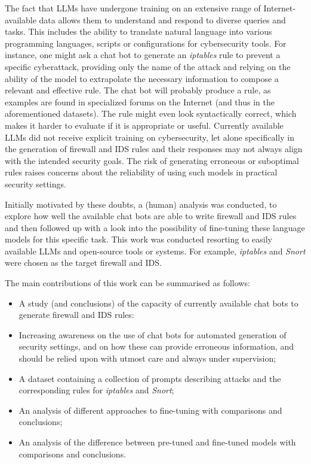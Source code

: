 \documentclass[sigconf]{acmart}
\begin{document}
The fact that LLMs have undergone training on an extensive range of Internet-available data allows them to understand and respond to diverse queries and tasks. This includes the ability to translate natural language into various programming languages, scripts or configurations for cybersecurity tools. For instance, one might ask a chat bot to generate an \textit{iptables} rule to prevent a specific cyberattack, providing only the name of the attack and relying on the ability of the model to extrapolate the necessary information to compose a relevant and effective rule. The chat bot will probably produce a rule, as examples are found in specialized forums on the Internet (and thus in the aforementioned datasets). The rule might even look syntactically correct, which makes it harder to evaluate if it is appropriate or useful. Currently available LLMs did not receive explicit training on cybersecurity, let alone specifically in the generation of firewall and IDS rules and their responses may not always align with the intended security goals. The risk of generating erroneous or suboptimal rules raises concerns about the reliability of using such models in practical security settings.

Initially motivated by these doubts, a (human) analysis was conducted, to explore how well the available chat bots are able to write firewall and IDS rules and then followed up with a look into the possibility of fine-tuning these language models for this specific task. This work was conducted resorting to easily available LLMs and open-source tools or systems. For example, \textit{iptables} \cite{Russell98} and \textit{Snort} \cite{Roesch98} were chosen as the target firewall and IDS.

The main contributions of this work can be summarised as follows:
\begin{itemize}
    \item A study (and conclusions) of the capacity of currently available chat bots to generate firewall and IDS rules:
    \item Increasing awareness on the use of chat bots for automated generation of security settings, and on how these can provide erroneous information, and should be relied upon with utmost care and always under supervision;
    \item A dataset containing a collection of prompts describing attacks and the corresponding rules for \textit{iptables} and \textit{Snort};
    \item An analysis of different approaches to fine-tuning with comparisons and conclusions;
    \item An analysis of the difference between pre-tuned and fine-tuned models with comparisons and conclusions.
\end{itemize}
\end{document}
